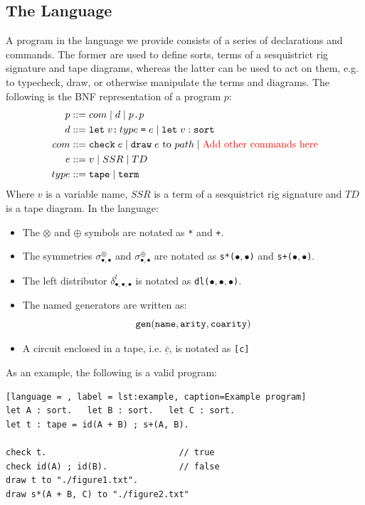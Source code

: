 \documentclass{article}
\begin{document}
\subsection{The Language}

A program in the language we provide consists of a series of declarations and commands. The former are used to define sorts, terms of a sesquistrict rig signature and tape diagrams, whereas the latter can be used to act on them, e.g. to typecheck, draw, or otherwise manipulate the terms and diagrams. The following is the BNF representation of a program $p$:
\begin{align*}
 p &::= com \mid d \mid p \texttt{.} p\\
 d &::= \texttt{let}\; v \texttt{:}\,type\;\texttt{=}\; e \mid \texttt{let}\; v : \texttt{sort}\\
 com &::= \texttt{check} \;e \mid \texttt{draw} \;e \text{ to } path \mid \text{\color{red} Add other commands here}\\
 e &::= v \mid SSR \mid TD\\
 type &::= \texttt{tape} \mid \texttt{term}
\end{align*}
Where $v$ is a variable name, $SSR$ is a term of a sesquistrict rig signature and $TD$ is a tape diagram. In the language:

\begin{itemize}
 \item The $\otimes$ and $\oplus$ symbols are notated as \texttt{*} and \texttt{+}.
 \item The symmetries $\sigma^{\otimes}_{\bullet, \bullet}$ and $\sigma^{\oplus}_{\bullet, \bullet}$ are notated as \texttt{s*($\bullet, \bullet$)} and \texttt{s+($\bullet, \bullet$)}.
 \item The left distributor $\delta^l_{\bullet, \bullet, \bullet}$ is notated as \texttt{dl($\bullet, \bullet, \bullet$)}.
 \item The named generators are written as:
\[ \tt gen(name, arity, coarity) \]
 \item A circuit enclosed in a tape, i.e. $\underline{\overline{c}}$, is notated as \texttt{[c]}
\end{itemize}
As an example, the following is a valid program:
\begin{lstlisting}[language = , label = lst:example, caption=Example program]
let A : sort.   let B : sort.   let C : sort.
let t : tape = id(A + B) ; s+(A, B).

check t.                          // true
check id(A) ; id(B).              // false
draw t to "./figure1.txt".
draw s*(A + B, C) to "./figure2.txt"
\end{lstlisting}
\end{document}
